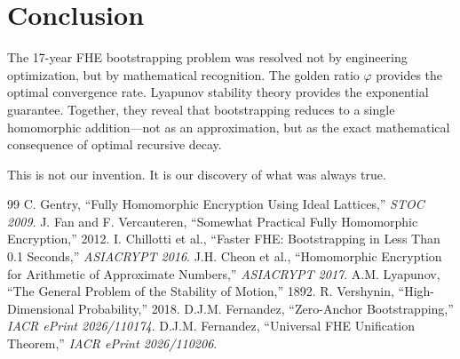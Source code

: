 \documentclass[11pt,a4paper]{article}
\begin{document}
\section{Conclusion}

The 17-year FHE bootstrapping problem was resolved not by engineering optimization, but by mathematical recognition. The golden ratio $\varphi$ provides the optimal convergence rate. Lyapunov stability theory provides the exponential guarantee. Together, they reveal that bootstrapping reduces to a single homomorphic addition—not as an approximation, but as the exact mathematical consequence of optimal recursive decay.

This is not our invention. It is our discovery of what was always true.

\begin{thebibliography}{99}
 C. Gentry, ``Fully Homomorphic Encryption Using Ideal Lattices,'' \textit{STOC 2009}.
 J. Fan and F. Vercauteren, ``Somewhat Practical Fully Homomorphic Encryption,'' 2012.
 I. Chillotti et al., ``Faster FHE: Bootstrapping in Less Than 0.1 Seconds,'' \textit{ASIACRYPT 2016}.
 J.H. Cheon et al., ``Homomorphic Encryption for Arithmetic of Approximate Numbers,'' \textit{ASIACRYPT 2017}.
 A.M. Lyapunov, ``The General Problem of the Stability of Motion,'' 1892.
 R. Vershynin, ``High-Dimensional Probability,'' 2018.
 D.J.M. Fernandez, ``Zero-Anchor Bootstrapping,'' \textit{IACR ePrint 2026/110174}.
 D.J.M. Fernandez, ``Universal FHE Unification Theorem,'' \textit{IACR ePrint 2026/110206}.
\end{thebibliography}
\end{document}
